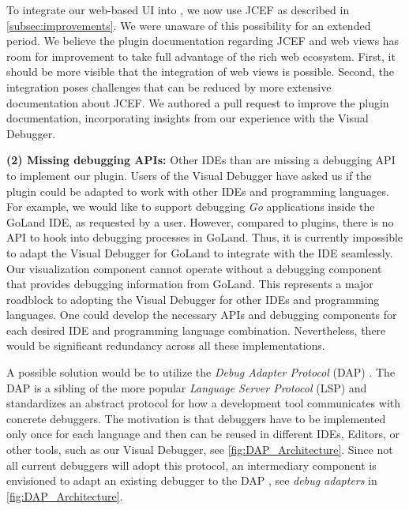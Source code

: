 \documentclass[sigconf]{acmart}
\begin{document}
To integrate our web-based UI into \intellij{}, we now use JCEF as described in \autoref{subsec:improvements}.
We were unaware of this possibility for an extended period.
We believe the plugin documentation regarding JCEF and web views has room for improvement to take full advantage of the rich web ecosystem.
First, it should be more visible that the integration of web views is possible.
Second, the integration poses challenges that can be reduced by more extensive documentation about JCEF.
We authored a pull request to improve the plugin documentation, incorporating insights from our experience with the Visual Debugger.

\textbf{(2) Missing debugging APIs:} Other IDEs than \intellij{} are missing a debugging API to implement our plugin.
Users of the Visual Debugger have asked us if the plugin could be adapted to work with other IDEs and programming languages.
For example, we would like to support debugging \textit{Go} applications inside the GoLand IDE, as requested by a user.
However, compared to \intellij{} plugins, there is no API to hook into debugging processes in GoLand.
Thus, it is currently impossible to adapt the Visual Debugger for GoLand to integrate with the IDE seamlessly.
Our visualization component cannot operate without a debugging component that provides debugging information from GoLand.
This represents a major roadblock to adopting the Visual Debugger for other IDEs and programming languages.
One could develop the necessary APIs and debugging components for each desired IDE and programming language combination.
Nevertheless, there would be significant redundancy across all these implementations.

A possible solution would be to utilize the \textit{Debug Adapter Protocol} (DAP) \cite{microsoftDebugAdapterProtocol2023}.
The DAP is a sibling of the more popular \textit{Language Server Protocol} (LSP) \cite{microsoftLanguageServerProtocol2023} and standardizes an abstract protocol for how a development tool communicates with concrete debuggers.
The motivation is that debuggers have to be implemented only once for each language and then can be reused in different IDEs, Editors, or other tools, such as our Visual Debugger, see \autoref{fig:DAP_Architecture}.
Since not all current debuggers will adopt this protocol, an intermediary component is envisioned to adapt an existing debugger to the DAP \cite{microsoftDebugAdapterProtocol2023}, see \textit{debug adapters} in \autoref{fig:DAP_Architecture}.
\end{document}
